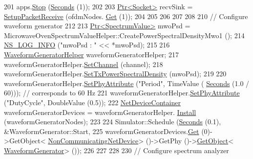 \begin{DoxyCode}
201   apps.\hyperlink{classns3_1_1ApplicationContainer_adfc52f9aa4020c8714679b00bbb9ddb3}{Stop} (\hyperlink{group__timecivil_ga33c34b816f8ff6628e33d5c8e9713b9e}{Seconds} (1));
202 
203   \hyperlink{classns3_1_1Ptr}{Ptr<Socket>} recvSink = \hyperlink{adhoc-aloha-ideal-phy-with-microwave-oven_8cc_a3858f39b0c1d0e52120fef78a82673cb}{SetupPacketReceive} (ofdmNodes.
      \hyperlink{classns3_1_1NodeContainer_a9ed96e2ecc22e0f5a3d4842eb9bf90bf}{Get} (1));
204 
205 
206 
207 
208 
210   \textcolor{comment}{// Configure waveform generator}
212 \textcolor{comment}{}
213   \hyperlink{classns3_1_1Ptr}{Ptr<SpectrumValue>} mwoPsd =  
      MicrowaveOvenSpectrumValueHelper::CreatePowerSpectralDensityMwo1 ();
214   \hyperlink{group__logging_gafbd73ee2cf9f26b319f49086d8e860fb}{NS\_LOG\_INFO} (\textcolor{stringliteral}{"mwoPsd : "} << *mwoPsd);
215 
216   \hyperlink{classns3_1_1WaveformGeneratorHelper}{WaveformGeneratorHelper} waveformGeneratorHelper;
217   waveformGeneratorHelper.\hyperlink{classns3_1_1WaveformGeneratorHelper_a5342430dda9bf0c11725010f09124a56}{SetChannel} (channel);
218   waveformGeneratorHelper.\hyperlink{classns3_1_1WaveformGeneratorHelper_a1c76759d1f262edec838f1475893ce70}{SetTxPowerSpectralDensity} (mwoPsd);
219 
220   waveformGeneratorHelper.\hyperlink{classns3_1_1WaveformGeneratorHelper_a93eae78a254e7d32651c7c50e055b1bb}{SetPhyAttribute} (\textcolor{stringliteral}{"Period"}, TimeValue (
      \hyperlink{group__timecivil_ga33c34b816f8ff6628e33d5c8e9713b9e}{Seconds} (1.0 / 60)));   \textcolor{comment}{// corresponds to 60 Hz}
221   waveformGeneratorHelper.\hyperlink{classns3_1_1WaveformGeneratorHelper_a93eae78a254e7d32651c7c50e055b1bb}{SetPhyAttribute} (\textcolor{stringliteral}{"DutyCycle"}, DoubleValue (0.5));
222   \hyperlink{classns3_1_1NetDeviceContainer}{NetDeviceContainer} waveformGeneratorDevices = waveformGeneratorHelper.
      \hyperlink{classns3_1_1WaveformGeneratorHelper_a61d491cf9b6488bf5ff1b7ae2f245eb0}{Install} (waveformGeneratorNodes);
223 
224   Simulator::Schedule (\hyperlink{group__timecivil_ga33c34b816f8ff6628e33d5c8e9713b9e}{Seconds} (0.1), &WaveformGenerator::Start,
225                        waveformGeneratorDevices.\hyperlink{classns3_1_1NetDeviceContainer_a677d62594b5c9d2dea155cc5045f4d0b}{Get} (0)->GetObject<
      \hyperlink{classns3_1_1NonCommunicatingNetDevice}{NonCommunicatingNetDevice}> ()->GetPhy ()->\hyperlink{classns3_1_1Object_a13e18c00017096c8381eb651d5bd0783}{GetObject}<
      \hyperlink{classns3_1_1WaveformGenerator}{WaveformGenerator}> ());
226   
227 
228 
230   \textcolor{comment}{// Configure spectrum analyzer}

\end{DoxyCode}
